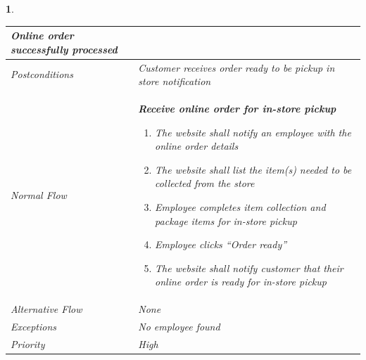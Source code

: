 \documentclass{scrreprt}
\theoremstyle{funreq}
\newtheorem{funreq}{}
\begin{document}
\begin{funreq}
\begin{table}[H]
{\begin{tabularx}{\columnwidth}{|l|X|}
					Online order successfully processed
					\\ \hline Postconditions   & 
					Customer receives order ready to be pickup in store notification
					\\ \hline Normal Flow &
					\bfseries{Receive online order for in-store pickup}\normalfont\newline 
					\begin{enumerate}
					    \item The website shall notify an employee with the online order details
					    \item The website shall list the item(s) needed to be collected from the store
                        \item Employee completes item collection and package items for in-store pickup
                        \item Employee clicks “Order ready”
                        \item The website shall notify customer that their online order is ready for in-store pickup
					\end{enumerate}
					\\ \hline Alternative Flow & 
					None
					\\ \hline Exceptions & 
					No employee found
					\\ \hline Priority & 
					High
					\\ \hline
				\end{tabularx}%
			}
		\end{table}
	\end{funreq}

	
	
\end{document}
